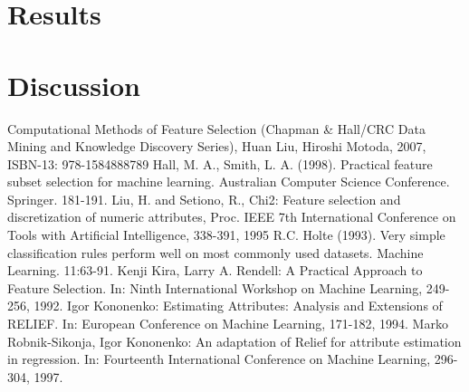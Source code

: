 \documentclass[10pt]{article}\usepackage[]{graphicx}\usepackage[]{color}
\begin{document}
\clearpage
\part{Results}





\clearpage
\part{Discussion}






\clearpage
\begin{thebibliography}{99}
\bibitem{} Computational Methods of Feature Selection (Chapman \& Hall/CRC Data Mining and Knowledge Discovery Series), Huan Liu, Hiroshi Motoda, 2007, ISBN-13: 978-1584888789  
\bibitem{} Hall, M. A., Smith, L. A. (1998). Practical feature subset selection for machine learning. Australian Computer Science Conference. Springer. 181-191.
\bibitem{} Liu, H. and Setiono, R., Chi2: Feature selection and discretization of numeric attributes, Proc. IEEE 7th International Conference on Tools with Artificial Intelligence, 338-391, 1995
\bibitem{} R.C. Holte (1993). Very simple classification rules perform well on most commonly used datasets. Machine Learning. 11:63-91.
\bibitem{} Kenji Kira, Larry A. Rendell: A Practical Approach to Feature Selection. In: Ninth International Workshop on Machine Learning, 249-256, 1992.
\bibitem{} Igor Kononenko: Estimating Attributes: Analysis and Extensions of RELIEF. In: European Conference on Machine Learning, 171-182, 1994.
\bibitem{} Marko Robnik-Sikonja, Igor Kononenko: An adaptation of Relief for attribute estimation in regression. In: Fourteenth International Conference on Machine Learning, 296-304, 1997.
\end{thebibliography}
\end{document}
